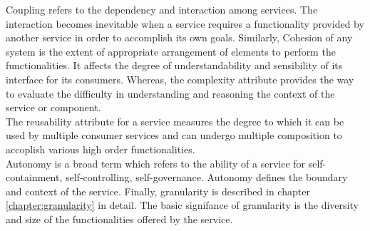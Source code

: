 Coupling refers to the dependency and interaction among services. The interaction becomes inevitable when a service requires a functionality provided by another service in order to accomplish its own goals. Similarly, Cohesion of any system is the extent of appropriate arrangement of elements to perform the functionalities. It affects the degree of understandability and sensibility of its interface for its consumers. Whereas, the complexity attribute provides the way to evaluate the difficulty in understanding and reasoning the context of the service or component.\cite{Elhag:2014aa}
\\
The reusability attribute for a service measures the degree to which it can be used by multiple consumer services and can undergo multiple composition to accoplish various high order functionalities. \cite{Feuerlicht:2007aa}
\\
Autonomy is a broad term which refers to the ability of a service for self-containment, self-controlling, self-governance. Autonomy defines the boundary and context of the service. \cite{Ma:2007aa} Finally, granularity is described in chapter \ref{chapter:granularity} in detail. The basic signifance of granularity is the diversity and size of the functionalities offered by the service. \cite{Elhag:2014aa}

